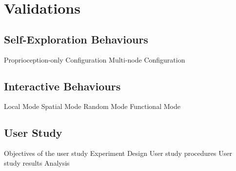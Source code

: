 \chapter{Validations}

\section{Self-Exploration Behaviours}
Proprioception-only Configuration
Multi-node Configuration

\section{Interactive Behaviours}

Local Mode
Spatial Mode
Random Mode
Functional Mode

\section{User Study}
Objectives of the user study
Experiment Design
User study procedures
User study results
Analysis
